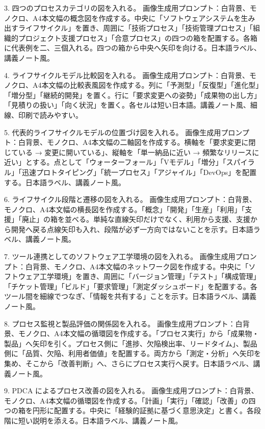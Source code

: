 \documentclass[uplatex,dvipdfmx,a4paper,11pt]{jsarticle}
\begin{document}
3. 四つのプロセスカテゴリの図を入れる。 画像生成用プロンプト：白背景、モノクロ、A4本文幅の概念図を作成する。中央に「ソフトウェアシステムを生み出すライフサイクル」を置き、周囲に「技術プロセス」「技術管理プロセス」「組織的プロジェクト支援プロセス」「合意プロセス」の四つの箱を配置する。各箱に代表例を二、三個入れる。四つの箱から中央へ矢印を向ける。日本語ラベル、講義ノート風。

4. ライフサイクルモデル比較図を入れる。 画像生成用プロンプト：白背景、モノクロ、A4本文幅の比較表風図を作成する。列に「予測型」「反復型」「進化型」「増分型」「継続的開発」を置く。行に「要求変更への姿勢」「成果物の出し方」「見積りの扱い」「向く状況」を置く。各セルは短い日本語。講義ノート風、細線、印刷で読みやすい。

5. 代表的ライフサイクルモデルの位置づけ図を入れる。 画像生成用プロンプト：白背景、モノクロ、A4本文幅の二軸図を作成する。横軸を「要求変更に閉じている → 変更に開いている」、縦軸を「単一納品に近い → 頻繁なリリースに近い」とする。点として「ウォーターフォール」「Vモデル」「増分」「スパイラル」「迅速プロトタイピング」「統一プロセス」「アジャイル」「DevOps」を配置する。日本語ラベル、講義ノート風。

6. ライフサイクル段階と遷移の図を入れる。 画像生成用プロンプト：白背景、モノクロ、A4本文幅の横長図を作成する。「概念」「開発」「生産」「利用」「支援」「廃止」の箱を並べる。単純な直線矢印だけでなく、利用から支援、支援から開発へ戻る点線矢印も入れ、段階が必ず一方向ではないことを示す。日本語ラベル、講義ノート風。

7. ツール連携としてのソフトウェア工学環境の図を入れる。 画像生成用プロンプト：白背景、モノクロ、A4本文幅のネットワーク図を作成する。中央に「ソフトウェア工学環境」を置き、周囲に「バージョン管理」「テスト」「構成管理」「チケット管理」「ビルド」「要求管理」「測定ダッシュボード」を配置する。各ツール間を細線でつなぎ、「情報を共有する」ことを示す。日本語ラベル、講義ノート風。

8. プロセス監視と製品評価の関係図を入れる。 画像生成用プロンプト：白背景、モノクロ、A4本文幅の循環図を作成する。「プロセス実行」から「成果物・製品」へ矢印を引く。プロセス側に「進捗、欠陥検出率、リードタイム」、製品側に「品質、欠陥、利用者価値」を配置する。両方から「測定・分析」へ矢印を集め、そこから「改善判断」へ、さらにプロセス実行へ戻す。日本語ラベル、講義ノート風。

9. PDCA によるプロセス改善の図を入れる。 画像生成用プロンプト：白背景、モノクロ、A4本文幅の循環図を作成する。「計画」「実行」「確認」「改善」の四つの箱を円形に配置する。中央に「経験的証拠に基づく意思決定」と書く。各段階に短い説明を添える。日本語ラベル、講義ノート風。
\end{document}
